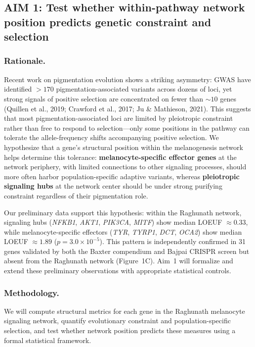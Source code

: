 \documentclass[11pt]{article}
\begin{document}
\subsection{AIM 1: Test whether within-pathway network position predicts genetic constraint and selection}

\subsubsection{Rationale.}
Recent work on pigmentation evolution shows a striking asymmetry: GWAS have identified $> 170$ pigmentation-associated variants across dozens of loci, yet strong signals of positive selection are concentrated on fewer than $\sim 10$ genes (Quillen et al., 2019; Crawford et al., 2017; Ju \& Mathieson, 2021). This suggests that most pigmentation-associated loci are limited by pleiotropic constraint rather than free to respond to selection---only some positions in the pathway can tolerate the allele-frequency shifts accompanying positive selection. We hypothesize that a gene's structural position within the melanogenesis network helps determine this tolerance: \textbf{melanocyte-specific effector genes} at the network periphery, with limited connections to other signaling processes, should more often harbor population-specific adaptive variants, whereas \textbf{pleiotropic signaling hubs} at the network center should be under strong purifying constraint regardless of their pigmentation role.

Our preliminary data support this hypothesis: within the Raghunath network, signaling hubs (\emph{NFKB1}, \emph{AKT1}, \emph{PIK3CA}, \emph{MITF}) show median LOEUF $\approx 0.33$, while melanocyte-specific effectors (\emph{TYR}, \emph{TYRP1}, \emph{DCT}, \emph{OCA2}) show median LOEUF $\approx 1.89$ ($p = 3.0 \times 10^{-5}$). This pattern is independently confirmed in 31 genes validated by both the Baxter compendium and Bajpai CRISPR screen but absent from the Raghunath network (Figure~1C). Aim~1 will formalize and extend these preliminary observations with appropriate statistical controls.

\subsubsection{Methodology.}
We will compute structural metrics for each gene in the Raghunath melanocyte signaling network, quantify evolutionary constraint and population-specific selection, and test whether network position predicts these measures using a formal statistical framework.
\end{document}
